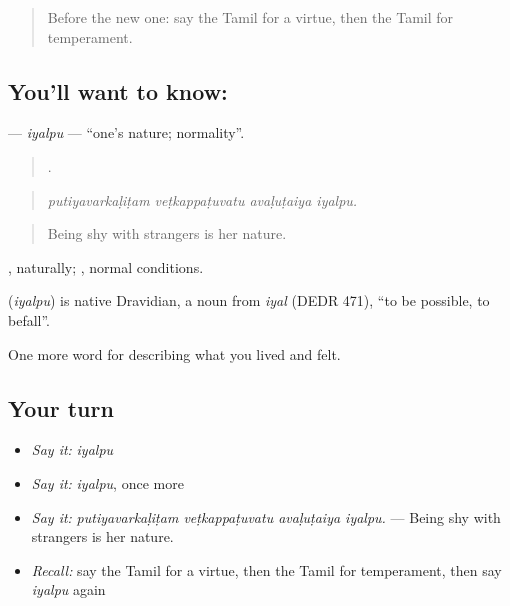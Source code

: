 \label{lesson:TA-C471-iyalpu}



\begin{quote}
Before the new one: say the Tamil for a virtue, then the Tamil for temperament.
\end{quote}

\subsection*{You'll want to know: }
\textbf{} — \emph{iyalpu} — \textquotedblleft{}one’s nature; normality\textquotedblright{}.

\begin{quote}
   .
\end{quote}

\begin{quote}
\emph{putiyavarkaḷiṭam veṭkappaṭuvatu avaḷuṭaiya iyalpu.}
\end{quote}

\begin{quote}
Being shy with strangers is her nature.
\end{quote}

, naturally;  , normal conditions.

\begin{cousinweb}
\textbf{} (\emph{iyalpu}) is native Dravidian, a noun from  \emph{iyal} (DEDR 471), \textquotedblleft{}to be possible, to befall\textquotedblright{}.
\end{cousinweb}

\begin{grammarlens}[title={What you've built}]
One more word for describing what you lived and felt.
\end{grammarlens}

\subsection*{Your turn}
\begin{itemize}
\raggedright
  \item \emph{Say it:} \emph{iyalpu}
  \item \emph{Say it:} \emph{iyalpu}, once more
  \item \emph{Say it:} \emph{putiyavarkaḷiṭam veṭkappaṭuvatu avaḷuṭaiya iyalpu.} — Being shy with strangers is her nature.
  \item \emph{Recall:} say the Tamil for a virtue, then the Tamil for temperament, then say \emph{iyalpu} again
\end{itemize}

